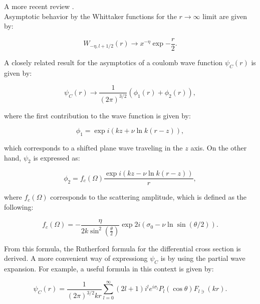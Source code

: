 \documentclass[openany]{book}
\begin{document}
A more recent review \cite{descouvemont_baye_2010}. \\

Asymptotic behavior by the Whittaker functions for the $r \rightarrow \infty$ limit are given by: 

\begin{equation}\label{rmatrix_whittaker_asymptotics}
	W_{-\eta, l + 1/2} (r) \rightarrow x^{-\eta} \exp {-\frac{r}{2}}.
\end{equation}

A closely related result for the asymptotics of a coulomb wave function $\psi_C(r)$ is given by:

\begin{equation}\label{rmatrix_coulombPsi_asymptotics}
	\psi_C(r) \rightarrow \frac{1}{(2\pi)^{3/2}} \left(\phi_1(r) + \phi_2(r)\right),
\end{equation}

where the first contribution to the wave function is given by:

\begin{equation}\label{rmatrix_coulombPsi_asymptotics_1}
	\phi_1 = \exp {i (kz + \nu 	\ln {k(r-z)}) },
\end{equation}

which corresponds to a shifted plane wave traveling in the $z$ axis. On the other hand, $\psi_2$ is expressed as: 

\begin{equation}\label{rmatrix_coulombPsi_asymptotics_2}
	\phi_2 = f_c(\Omega) \frac{\exp {i (kz - \nu 	\ln {k(r-z)}) }}{r},
\end{equation}

where $f_c(\Omega)$ corresponds to the scattering amplitude, which is defined as the following: 

\begin{equation}\label{rmatrix_coulombPsi_scatteringAmplitude}
	f_c(\Omega) = - \frac{\eta}{2k\sin^2 \left(\frac{\theta}{2}\right)} \exp{ 2i \left(\sigma_0 - \nu \ln \sin (\theta /2)\right)}.
\end{equation}

From this formula, the Rutherford formula for the differential cross section is derived. A more convenient way of expressiong $\psi_C$ is by using the partial wave expansion. For example, a useful formula in this context is given by: 

 \begin{equation}\label{rmatrix_coulombPsi_partialWaves}
	\psi_C(r) = \frac{1}{(2\pi)^{3/2}kr} \sum_{l=0}^{\infty} { (2l + 1) i^l e^{i\sigma_l} P_l(\cos \theta) F_{l\ni} (kr)}.
 \end{equation}
\end{document}
